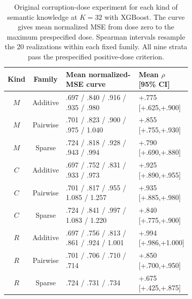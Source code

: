 \begin{table}[H]
\caption{Original corruption-dose experiment for each kind of semantic knowledge at $K=32$ with XGBoost. The curve gives mean normalized MSE from dose zero to the maximum prespecified dose. Spearman intervals resample the 20 realizations within each fixed family. All nine strata pass the prespecified positive-dose criterion.}
\label{tab:app-layer-corruption-dose}
\label{tab:app_mcr_dose}
\centering\tiny
\setlength{\tabcolsep}{3.5pt}
\begin{tabular}{ccP{0.46\linewidth}P{0.26\linewidth}}
\toprule Kind & Family & Mean normalized-MSE curve & Mean $\rho$ [95\% CI] \\
\midrule
$M$ & Additive & .697 / .840 / .916 / .935 / .980 & +.775 [+.625,+.900] \\
$M$ & Pairwise & .701 / .823 / .900 / .975 / 1.040 & +.855 [+.755,+.930] \\
$M$ & Sparse & .724 / .818 / .928 / .943 / .994 & +.790 [+.690,+.880] \\
$C$ & Additive & .697 / .752 / .831 / .933 / .973 & +.925 [+.890,+.955] \\
$C$ & Pairwise & .701 / .817 / .955 / 1.085 / 1.257 & +.935 [+.885,+.980] \\
$C$ & Sparse & .724 / .841 / .997 / 1.083 / 1.220 & +.840 [+.775,+.900] \\
$R$ & Additive & .697 / .756 / .813 / .861 / .924 / 1.001 & +.994 [+.986,+1.000] \\
$R$ & Pairwise & .701 / .706 / .710 / .714 & +.850 [+.700,+.950] \\
$R$ & Sparse & .724 / .731 / .734 & +.675 [+.425,+.875] \\
\bottomrule
\end{tabular}
\end{table}

